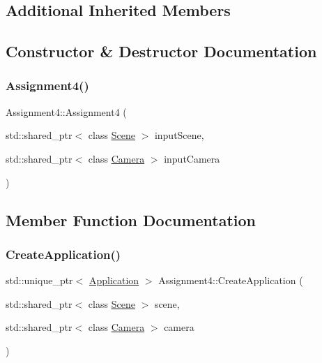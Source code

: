 \subsection*{Additional Inherited Members}


\subsection{Constructor \& Destructor Documentation}
\hypertarget{class_assignment4_a318b02cf93165113069f3b44a8d13589}{}\label{class_assignment4_a318b02cf93165113069f3b44a8d13589}
\subsubsection{\texorpdfstring{Assignment4()}{Assignment4()}}
{\footnotesize\ttfamily Assignment4\+::\+Assignment4 (\begin{DoxyParamCaption}\item[{std\+::shared\+\_\+ptr$<$ class \hyperlink{class_scene}{Scene} $>$}]{input\+Scene,  }\item[{std\+::shared\+\_\+ptr$<$ class \hyperlink{class_camera}{Camera} $>$}]{input\+Camera }\end{DoxyParamCaption})}



\subsection{Member Function Documentation}
\hypertarget{class_assignment4_a7a2d272e1ce394cd4e7b66e840c2c806}{}\label{class_assignment4_a7a2d272e1ce394cd4e7b66e840c2c806}
\subsubsection{\texorpdfstring{Create\+Application()}{CreateApplication()}}
{\footnotesize\ttfamily std\+::unique\+\_\+ptr$<$ \hyperlink{class_application}{Application} $>$ Assignment4\+::\+Create\+Application (\begin{DoxyParamCaption}\item[{std\+::shared\+\_\+ptr$<$ class \hyperlink{class_scene}{Scene} $>$}]{scene,  }\item[{std\+::shared\+\_\+ptr$<$ class \hyperlink{class_camera}{Camera} $>$}]{camera }\end{DoxyParamCaption})\hspace{0.3cm}{\ttfamily [static]}}

